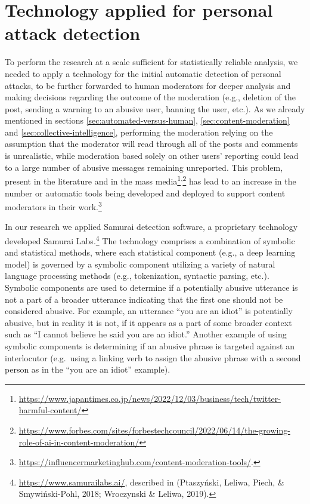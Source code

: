 \documentclass[preprint,12pt]{elsarticle}
\begin{document}






\section{Technology applied for personal attack detection}
\label{sec:technology}

To perform the research at a scale sufficient for statistically reliable analysis, we needed to apply a technology for the initial automatic detection of personal attacks, to be further forwarded to human moderators for deeper analysis and making decisions regarding the outcome of the moderation (e.g., deletion of the post, sending a warning to an abusive user, banning the user, etc.). As we already mentioned in sections \ref{sec:automated-versus-human}, \ref{sec:content-moderation} and \ref{sec:collective-intelligence}, performing the moderation relying on the assumption that the moderator will read through all of the posts and comments is unrealistic, while moderation based solely on  other users' reporting could lead to a large number of abusive messages remaining unreported. This problem, present   in the literature \citep{ptaszynski2018automatic,urbaniak2022personal} and in  the mass media\footnote{\url{https://www.japantimes.co.jp/news/2022/12/03/business/tech/twitter-harmful-content/}}\textsuperscript{,}\footnote{\url{https://www.forbes.com/sites/forbestechcouncil/2022/06/14/the-growing-role-of-ai-in-content-moderation/}} has lead to an increase in the number or automatic tools being developed  and deployed to support content moderators in their work.\footnote{\url{https://influencermarketinghub.com/content-moderation-tools/}.} 

In our research  we applied Samurai detection software, a
proprietary technology developed Samurai Labs.\footnote{\url{https://www.samurailabs.ai/},
  described in (Ptaszyński, Leliwa, Piech, \& Smywiński-Pohl, 2018;
  Wroczynski \& Leliwa, 2019).} The technology comprises a combination
of symbolic and statistical methods, where each statistical component
(e.g., a deep learning model) is governed by a symbolic component
utilizing a variety of natural language processing methods (e.g.,
tokenization, syntactic parsing, etc.). Symbolic components are used to
determine if a potentially abusive utterance is not a part of a broader
utterance indicating that the first one should not be considered
abusive. For example, an utterance ``you are an idiot'' is potentially
abusive, but in reality it is not, if it appears as a part of some broader context
such as ``I cannot believe he said you are an idiot.'' Another
example of using symbolic components is determining if an abusive phrase
is targeted against an interlocutor (e.g.~using a linking verb to assign
the abusive phrase with a second person as in the ``you are an idiot''
example).
\end{document}
